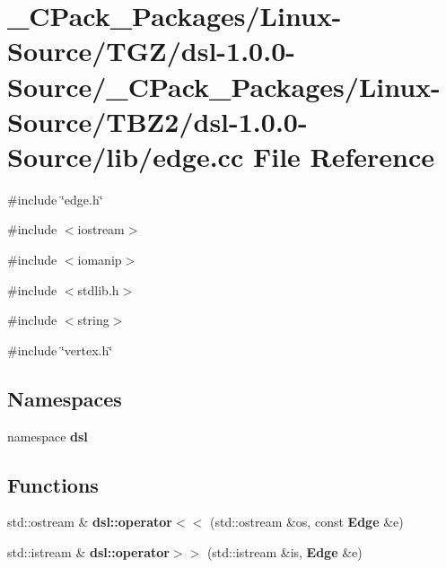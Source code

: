\section{\_\-CPack\_\-Packages/Linux-\/Source/TGZ/dsl-\/1.0.0-\/Source/\_\-CPack\_\-Packages/Linux-\/Source/TBZ2/dsl-\/1.0.0-\/Source/lib/edge.cc File Reference}
\label{__CPack__Packages_2Linux-Source_2TGZ_2dsl-1_80_80-Source_2__CPack__Packages_2Linux-Source_2TBZ2_0e76be0d3b3a4916392a568b1e0f90df}
{\ttfamily \#include \char`\"{}edge.h\char`\"{}}\par
{\ttfamily \#include $<$iostream$>$}\par
{\ttfamily \#include $<$iomanip$>$}\par
{\ttfamily \#include $<$stdlib.h$>$}\par
{\ttfamily \#include $<$string$>$}\par
{\ttfamily \#include \char`\"{}vertex.h\char`\"{}}\par
\subsection*{Namespaces}
\begin{DoxyCompactItemize}
\item 
namespace {\bf dsl}
\end{DoxyCompactItemize}
\subsection*{Functions}
\begin{DoxyCompactItemize}
\item 
std::ostream \& {\bf dsl::operator$<$$<$} (std::ostream \&os, const {\bf Edge} \&e)
\item 
std::istream \& {\bf dsl::operator$>$$>$} (std::istream \&is, {\bf Edge} \&e)
\end{DoxyCompactItemize}
